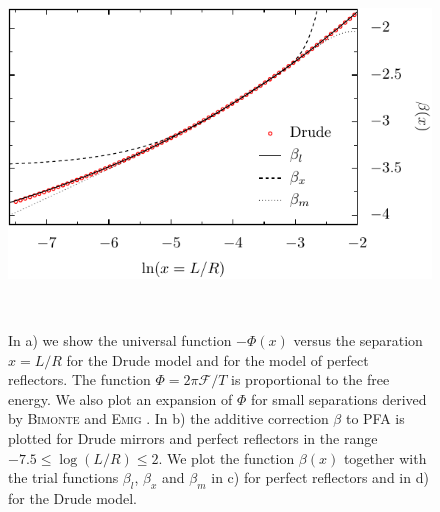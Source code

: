 \begin{figure}
\begin{minipage}[b]{.5\linewidth}
  \end{minipage}%
  \begin{minipage}[b]{.5\linewidth}
  \centering
  \includegraphics[scale=0.79]{plots/hiT/hiT_6_beta_vs_lnx_drude_fit.pdf}
  \end{minipage}
  \ \\
  \caption{In a) we show the universal function $-\Phi(x)$ versus the separation $x=L/R$
  for the Drude model and for the model of perfect reflectors. The function $\Phi = 2\pi\mathcal{F}/T$ is
  proportional to the free energy.
  We also plot an expansion of $\Phi$
  for small separations derived by \textsc{Bimonte} and \textsc{Emig} \cite{PhysRevLett.109.160403}.
  In b) the additive correction $\beta$ to PFA is plotted
  for Drude mirrors and perfect reflectors in the range $-7.5 \le \log(L/R) \le 2$.
  We plot the function $\beta(x)$ together with the trial functions $\beta_l$, $\beta_x$ and $\beta_m$
  in c) for perfect reflectors and in d) for the Drude model.}

  \label{fig_temp_hiT_phi_beta}
\end{figure}

